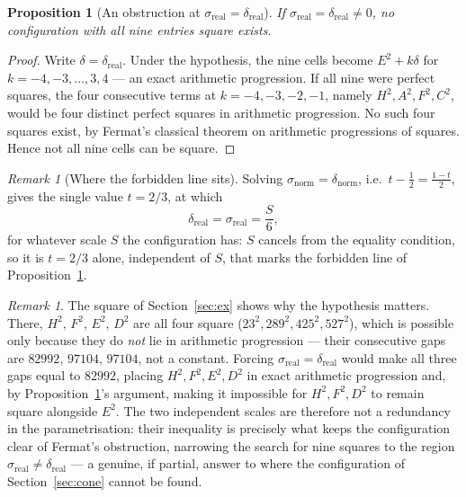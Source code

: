 \documentclass[12pt]{article}
\newtheorem{proposition}[theorem]{Proposition}
\theoremstyle{remark}
\newtheorem{remark}[theorem]{Remark}
\begin{document}
\begin{proposition}[An obstruction at $\sigma_{\text{real}}=\delta_{\text{real}}$]\label{prop:sigmaequaldelta}
If $\sigma_{\text{real}}=\delta_{\text{real}}\neq0$, no configuration
with all nine entries square exists.
\end{proposition}

\begin{proof}
Write $\delta=\delta_{\text{real}}$. Under the hypothesis, the nine
cells become $E^2+k\delta$ for $k=-4,-3,\ldots,3,4$ --- an exact
arithmetic progression. If all nine were perfect squares, the four
consecutive terms at $k=-4,-3,-2,-1$, namely $H^2,A^2,F^2,C^2$, would
be four distinct perfect squares in arithmetic progression. No such
four squares exist, by Fermat's classical theorem on arithmetic
progressions of squares. Hence not all nine cells can be square.
\end{proof}

\begin{remark}[Where the forbidden line sits]
Solving $\sigma_{\text{norm}}=\delta_{\text{norm}}$, i.e.\
$t-\tfrac12=\tfrac{1-t}{2}$, gives the single value $t=2/3$, at which
\[
\delta_{\text{real}} = \sigma_{\text{real}} = \frac{S}{6} ,
\]
for whatever scale $S$ the configuration has: $S$ cancels from the
equality condition, so it is $t=2/3$ alone, independent of $S$, that
marks the forbidden line of Proposition~\ref{prop:sigmaequaldelta}.
\end{remark}

\begin{remark}
The square of Section~\ref{sec:ex} shows why the hypothesis matters.
There, $H^2$, $F^2$, $E^2$, $D^2$ are all four square
($23^2,289^2,425^2,527^2$), which is possible only because they do
\emph{not} lie in arithmetic progression --- their consecutive gaps are
$82992$, $97104$, $97104$, not a constant. Forcing
$\sigma_{\text{real}}=\delta_{\text{real}}$ would make all three gaps
equal to $82992$, placing $H^2,F^2,E^2,D^2$ in exact arithmetic
progression and, by Proposition~\ref{prop:sigmaequaldelta}'s argument,
making it impossible for $H^2,F^2,D^2$ to remain square alongside
$E^2$. The two independent scales are therefore not a redundancy in
the parametrisation: their inequality is precisely what keeps the
configuration clear of Fermat's obstruction, narrowing the search for
nine squares to the region $\sigma_{\text{real}}\neq\delta_{\text{real}}$
--- a genuine, if partial, answer to where the configuration of
Section~\ref{sec:cone} cannot be found.
\end{remark}
\end{document}
